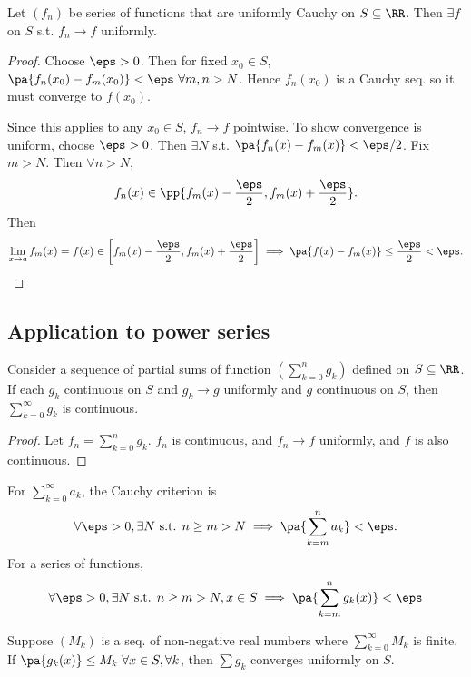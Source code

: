 \documentclass[11pt]{scrartcl}
\numberwithin{equation}{section}
\begin{document}
\begin{theorem}
    Let $(f_n)$ be series of functions that are uniformly Cauchy on 
    $S \subseteq\RR$. Then $\exists f$ on $S$ s.t. $f_n\to f$ uniformly.
\end{theorem}
\begin{proof}
    Choose $\eps>0$. Then for fixed $x_0\in S$, 
    $\pa{f_n(x_0)-f_m(x_0)} <\eps\ \forall m,n>N$.
    Hence $f_n(x_0)$ is a Cauchy seq. so it must converge to $f(x_0)$.

    Since this applies to any $x_0\in S$, $f_n\to f$ pointwise.
    To show convergence is uniform, choose $\eps>0$. Then $\exists N$
    s.t. $\pa{f_n(x)-f_m(x)}<\eps/2$. Fix $m>N$. 
    Then $\forall n>N$, 
    \[
        f_n(x)\in\pp{f_m(x)-\frac{\eps}{2}, f_m(x)+\frac{\eps}{2}}.
    \]
    Then 
    \[
        \lim_{x\rightarrow a}f_m(x) = f(x) \in \left[f_m(x)-\frac{\eps}{2}, f_m(x)+\frac{\eps}{2}\right]\implies \pa{f(x)-f_m(x)}\leq \frac{\eps}{2}<\eps.\qedhere
    \]
\end{proof}
\subsection{Application to power series}
\begin{proposition}
    Consider a sequence of partial sums of function $(\sum_{k=0}^{n}g_k)$
    defined on $S \subseteq\RR$. If each $g_k$ continuous on $S$
    and $g_k\to g$ uniformly and $g$ continuous on $S$,
    then $\sum_{k=0}^{\infty}g_k$ is continuous.
\end{proposition}

\begin{proof}
    Let $f_n=\sum_{k=0}^{n}g_k$. 
    $f_n$ is continuous, and $f_n\to f$ uniformly, and $f$ is also continuous.
\end{proof}

\begin{proposition}
    \label{prop:cauchycriterionfunction}
    For $\sum_{k=0}^{\infty}a_k$, the Cauchy criterion is 
    \[
        \forall \eps>0, \exists N\text{ s.t. } n\geq m>N \implies 
        \pa{\sum_{k=m}^{n}a_k}<\eps.
    \]
    For a series of functions,
    \[
        \forall \eps>0, \exists N\text{ s.t. } n\geq m>N, x\in S \implies
        \pa{\sum_{k=m}^{n}g_k(x)}<\eps
    \]
\end{proposition}

\begin{theorem}
    \label{thm:weirstrasmtest}
    Suppose $(M_k)$ is a seq. of non-negative real numbers
    where $\sum_{k=0}^{\infty}M_k$ is finite. If 
    $\pa{g_k(x)}\leq M_k\ \forall x\in S, \forall k$, then 
    $\sum g_k$ converges uniformly on $S$.
\end{theorem}
\end{document}
